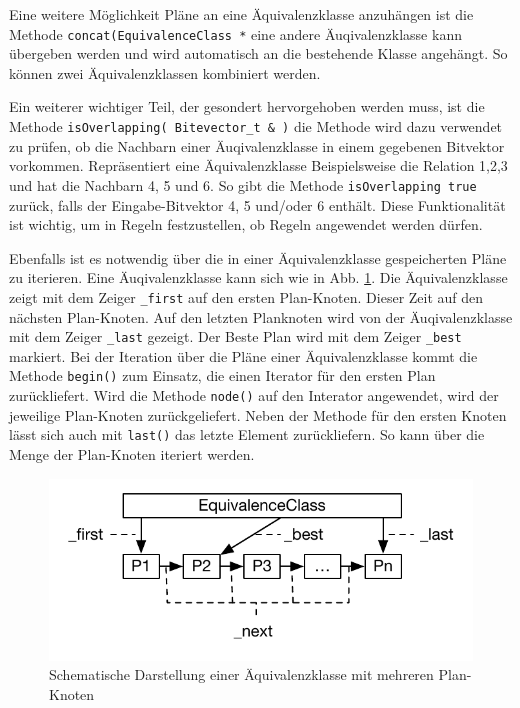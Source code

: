 Eine weitere Möglichkeit Pläne an eine Äquivalenzklasse anzuhängen ist die Methode \texttt{concat(EquivalenceClass *} eine andere Äuqivalenzklasse kann übergeben werden und wird automatisch an die bestehende Klasse angehängt. So können zwei Äquivalenzklassen kombiniert werden.



Ein weiterer wichtiger Teil, der gesondert hervorgehoben werden muss, ist die Methode \texttt{isOverlapping( Bitevector\_t \& )} die Methode wird dazu verwendet zu prüfen, ob die Nachbarn einer Äuqivalenzklasse in einem gegebenen Bitvektor vorkommen. Repräsentiert eine Äquivalenzklasse Beispielsweise die Relation 1,2,3 und hat die Nachbarn 4, 5 und 6. So gibt die Methode \texttt{isOverlapping true} zurück, falls der Eingabe-Bitvektor 4, 5 und/oder 6 enthält. Diese Funktionalität ist wichtig, um in Regeln festzustellen, ob Regeln angewendet werden dürfen.

Ebenfalls ist es notwendig über die in einer Äquivalenzklasse gespeicherten Pläne zu iterieren. Eine Äuqivalenzklasse kann sich wie in Abb. \ref{EquivalenceClassList}. Die Äquivalenzklasse zeigt mit dem Zeiger \texttt{\_first} auf den ersten Plan-Knoten. Dieser Zeit auf den nächsten Plan-Knoten. Auf den letzten Planknoten wird von der Äuqivalenzklasse mit dem Zeiger \texttt{\_last} gezeigt. Der Beste Plan wird mit dem Zeiger \texttt{\_best} markiert. Bei der Iteration über die Pläne einer Äquivalenzklasse kommt die Methode \texttt{begin()} zum Einsatz, die einen Iterator für den ersten Plan zurückliefert. Wird die Methode \texttt{node()} auf den Interator angewendet, wird der jeweilige Plan-Knoten zurückgeliefert. Neben der Methode für den ersten Knoten lässt sich auch mit \texttt{last()} das letzte Element zurückliefern. So kann über die Menge der Plan-Knoten iteriert werden.

\begin{figure}[ht]
  \centering
  \includegraphics{04_Implementierung/00_media/EquivalenceClassList.pdf}
  \caption{Schematische Darstellung einer Äquivalenzklasse mit mehreren Plan-Knoten}
  \label{EquivalenceClassList}
\end{figure}


